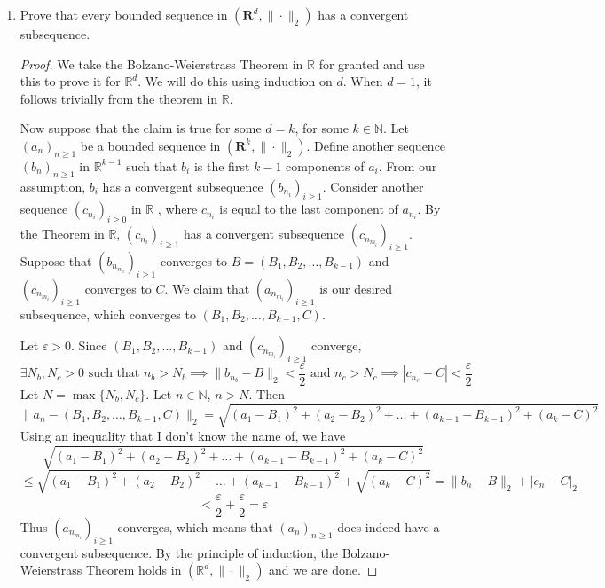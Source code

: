 \documentclass{article}
\newcommand{\R}{\mathbf{R}}
\theoremstyle{plain} %
\numberwithin{thm}{section} %
\theoremstyle{definition}
\begin{document}
    \begin{enumerate}[label=(\alph*)]
        \item Prove that every bounded sequence in $(\R^d,\|\cdot\|_2)$ has a convergent subsequence.
        
        \begin{proof}
            We take the Bolzano-Weierstrass Theorem in \(\mathbb{R}\) for granted and use this to prove it for \(\mathbb{R}^d\). We will do this using induction on \(d\). When \(d=1\), it follows trivially from the theorem in \(\mathbb{R}\).

            Now suppose that the claim is true for some \(d = k\), for some \(k \in \mathbb{N}\). Let \((a_n)_{n\geq1} \) be a bounded sequence in \((\R^k,\|\cdot\|_2)\). Define another sequence \((b_n)_{n\geq 1}\) in \(\mathbb{R}^{k-1}\) such that \(b_i\) is the first \(k-1\) components of \(a_i\). From our assumption, \(b_i\) has a convergent subsequence \((b_{n_i})_{i\geq1}\). Consider another sequence \((c_{n_i})_{i\geq0}\) in \(\mathbb{R}\) , where \(c_{n_i}\) is equal to the last component of \(a_{n_i}\). By the Theorem in \(\mathbb{R}\), \((c_{n_i})_{i\geq1}\) has a convergent subsequence \((c_{n_{m_i}})_{i\geq1}\). Suppose that \((b_{n_{m_i}})_{i\geq1}\) converges to \(B = (B_1, B_2, \dots, B_{k-1})\) and \((c_{n_{m_i}})_{i\geq1}\) converges to \(C\). We claim that \((a_{n_{m_i}})_{i\geq1}\) is our desired subsequence, which converges to \((B_1, B_2, \dots, B_{k-1}, C)\).

            Let \(\varepsilon > 0\). Since \((B_1, B_2, \dots, B_{k-1})\) and \((c_{n_{m_i}})_{i\geq1}\) converge,
            \[
                \exists N_b , N_c > 0 \text{ such that } n_b > N_b \implies \| b_{n_b} - B \| _2 < \frac{\varepsilon}{2}\text{ and } n_c > N_c \implies | c_{n_c} - C | < \frac{\varepsilon}{2}
            \]
            Let \(N = \max \{N_b, N_c\}\). Let \(n \in \mathbb{N}\), \(n > N\). Then
            \[
                \|a_n - (B_1, B_2, \dots, B_{k-1}, C) \| _2 = \sqrt{(a_1 - B_1)^2 + (a_2 - B_2)^2 + \dots + (a_{k-1} - B_{k-1})^2 + (a_k - C)^2} 
            \]
            Using an inequality that I don't know the name of, we have
            \[
                \sqrt{(a_1 - B_1)^2 + (a_2 - B_2)^2 + \dots + (a_{k-1} - B_{k-1})^2 + (a_k - C)^2}
            \]
            \[
                \leq \sqrt{(a_1 - B_1)^2 + (a_2 - B_2)^2 + \dots + (a_{k-1} - B_{k-1})^2} + \sqrt{(a_k - C)^2} = \| b_n - B \| _2 + | c_n - C | _2
            \]
            \[
                < \frac{\varepsilon}{2} + \frac{\varepsilon}{2} = \varepsilon
            \]
            Thus \((a_{n_{m_i}})_{i\geq1}\) converges, which means that \((a_n)_{n\geq1}\) does indeed have a convergent subsequence. By the principle of induction, the Bolzano-Weierstrass Theorem holds in \((\mathbb{R}^d, \|\cdot\|_2)\) and we are done.


\end{proof}
\end{enumerate}
\end{document}
